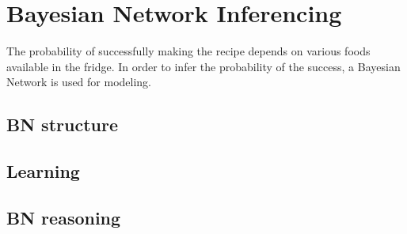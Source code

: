 \section{Bayesian Network Inferencing}
The probability of successfully making the recipe depends on various foods available in the fridge. In order to infer the probability of the success, a Bayesian Network is used for modeling.

\subsection{BN structure}

\subsection{Learning}

\subsection{BN reasoning}
